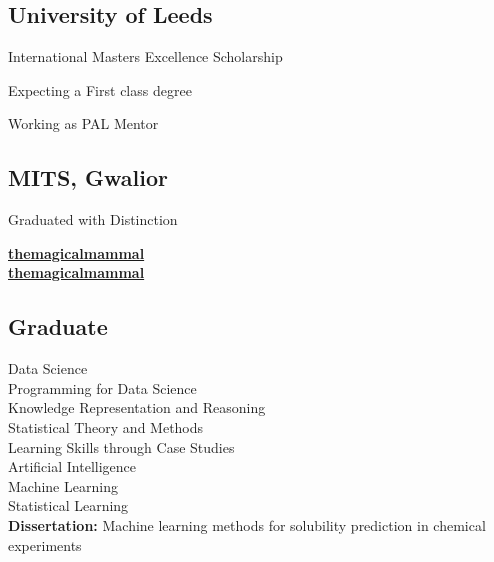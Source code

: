\documentclass[a4paper]{MagicalCV}
\begin{document}
\lastupdated


\begin{minipage}[t]{0.33\textwidth} 


\subsection{University of Leeds}
\vspace{\topsep} %
\begin{tightemize}
\item International Masters Excellence Scholarship
\item Expecting a First class degree
\item Working as PAL Mentor
\end{tightemize}
\sectionsep

\subsection{MITS, Gwalior}
Graduated with Distinction
\sectionsep


 \href{https://github.com/themagicalmammal}{\bf themagicalmammal} \\
 \href{https://www.linkedin.com/in/themagicalmammal/}{\bf themagicalmammal}
\sectionsep


\subsection{Graduate}
Data Science \\
Programming for Data Science \\
Knowledge Representation and Reasoning \\
Statistical Theory and Methods \\
Learning Skills through Case Studies \\
Artificial Intelligence \\
Machine Learning \\
Statistical Learning \\ 
\textbf{Dissertation: }
Machine learning methods for solubility prediction in chemical experiments
\sectionsep


\end{minipage}
\end{document}
